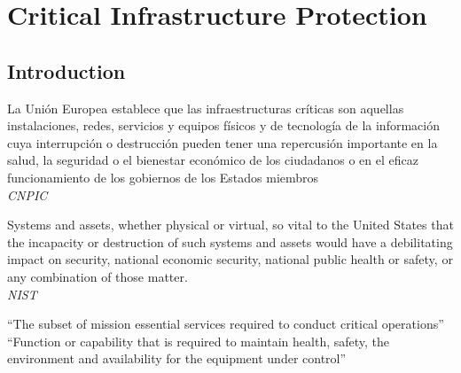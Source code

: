 \chapter{Critical Infrastructure Protection}
\label{chap:critical-infrastructure-protection}

\section{Introduction}

\begin{definition}
 La Unión Europea establece que las infraestructuras críticas son
aquellas instalaciones, redes, servicios y equipos físicos y de tecnología de
la información cuya interrupción o destrucción pueden tener una
repercusión importante en la salud, la seguridad o el bienestar económico
de los ciudadanos o en el eficaz funcionamiento de los gobiernos de los
Estados miembros\\
\textit{CNPIC}
\end{definition}

\begin{definition}
Systems and assets, whether physical or virtual, so vital to the United States that the
incapacity or destruction of such systems and assets would have a debilitating impact
on security, national economic security, national public health or safety, or any
combination of those matter.\\
\textit{NIST}
\end{definition}

\begin{definition}
``The subset of mission essential services required to conduct critical
operations''\\
``Function or capability that is required to maintain health, safety, the
environment and availability for the equipment under control''
\end{definition}

